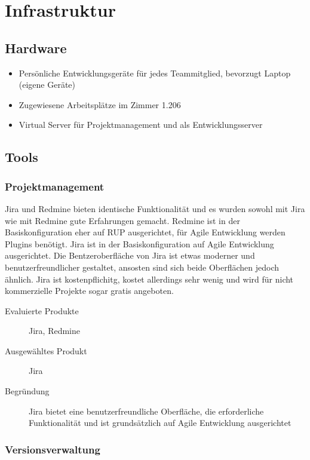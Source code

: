 \chapter{Infrastruktur}
	\section{Hardware}
		\begin{itemize}
			\setlength{\itemsep}{-\parsep}
			\item Persönliche Entwicklungsgeräte für jedes Teammitglied, bevorzugt Laptop (eigene Geräte)
			\item Zugewiesene Arbeitsplätze im Zimmer 1.206
			\item Virtual Server für Projektmanagement und als Entwicklungsserver
		\end{itemize}

		
	\section{Tools}
		\subsection{Projektmanagement}	
			Jira und Redmine bieten identische Funktionalität und es wurden sowohl mit Jira wie mit Redmine gute Erfahrungen gemacht. 
			Redmine ist in der Basiskonfiguration eher auf RUP ausgerichtet, für Agile Entwicklung werden Plugins benötigt. 
			Jira ist in der Basiskonfiguration auf Agile Entwicklung ausgerichtet. 
			Die Bentzeroberfläche von Jira ist etwas moderner und benutzerfreundlicher gestaltet, ansosten sind sich beide Oberflächen jedoch ähnlich. 
			Jira ist kostenpflichitg, kostet allerdings sehr wenig und wird für nicht kommerzielle Projekte sogar gratis angeboten.
		
			\begin{description}
				\item[Evaluierte Produkte] Jira, Redmine
				\item[Ausgewähltes Produkt] Jira
				\item[Begründung] Jira bietet eine benutzerfreundliche Oberfläche, die erforderliche Funktionalität und ist grundsätzlich auf Agile Entwicklung ausgerichtet
			\end{description}


		\subsection{Versionsverwaltung}
